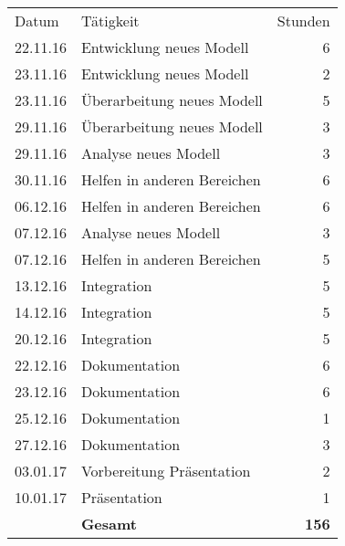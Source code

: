 \begin{minipage}{0.5\textwidth}
    \begin{tabular}{lp{4cm}r}
       Datum& Tätigkeit&Stunden\\
       
       22.11.16&Entwicklung neues \newline
		        Modell&6 \\
       23.11.16&Entwicklung neues \newline
		        Modell&2 \\
       23.11.16&Überarbeitung neues \newline
		        Modell&5 \\
       
       29.11.16&Überarbeitung neues \newline
		        Modell&3 \\
       29.11.16&Analyse neues Modell&3 \\
       30.11.16&Helfen in anderen \newline
			    Bereichen&6 \\
       
       06.12.16&Helfen in anderen \newline
		        Bereichen&6 \\
       07.12.16&Analyse neues Modell&3 \\
       07.12.16&Helfen in anderen \newline
		        Bereichen&5 \\
       
       13.12.16&Integration&5 \\
       14.12.16&Integration&5 \\ 
            
       20.12.16&Integration&5 \\
       
       22.12.16&Dokumentation&6 \\
       23.12.16&Dokumentation&6 \\
       25.12.16&Dokumentation&1 \\
       
       
       27.12.16&Dokumentation&3 \\
       03.01.17&Vorbereitung Präsentation&2 \\
       10.01.17&Präsentation&1 \\
       &\textbf{Gesamt}&\textbf{156}
    \end{tabular}
\end{minipage}
